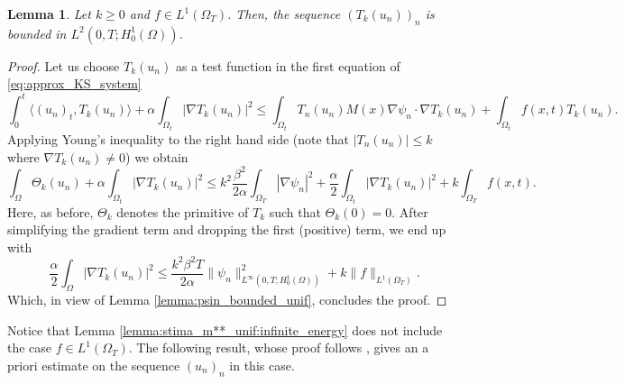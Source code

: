 \documentclass{amsart}
\numberwithin{equation}{section}
\newtheorem{lemma}[example]{Lemma}
\def\elle#1{L^{#1}}
\def\elleomT#1{L^{#1}(\Omega_T)}
\def\Hom{H^1_0(\Omega)}
\def\io{\int_\Omega}
\def\iot{\int_{\Omega_t}}
\def\ioT{\int_{\Omega_T}}
\def\norma#1#2{ \|#1 \|_{#2}}
\newcommand{\abs}[1]{\left|#1\right|}
\begin{document}
\begin{lemma}\label{lemma:Bound_Troncate}
    Let $k\geq 0$ and $f\in\elleomT1$. Then, the sequence $(T_k(u_n))_n$ is bounded in $\elle2(0,T;\Hom)$.
\end{lemma}
\begin{proof}
    Let us choose $T_k(u_n)$ as a test function in the first equation of \eqref{eq:approx_KS_system}
    $$
    \int_0^t \langle (u_n)_t,T_k(u_n)\rangle+\alpha\iot\abs{\nabla T_k(u_n)}^2\leq \iot T_n(u_n) M(x)\nabla\psi_n\cdot\nabla T_k(u_n) +\iot f(x,t)T_k(u_n).
    $$
    Applying Young's inequality to the right hand side (note that $\abs{T_n(u_n)}\leq k$ where $\nabla T_k(u_n)\neq0$) we obtain
    $$
    \io\Theta_k(u_n)+\alpha\iot\abs{\nabla T_k(u_n)}^2
    \leq 
    k^2\frac{\beta^2}{2\alpha}\ioT \abs{\nabla\psi_n}^2+\frac{\alpha}{2}\iot\abs{\nabla T_k(u_n)}^2 +k\ioT f(x,t).
    $$
    Here, as before, $\Theta_k$ denotes the primitive of $T_k$ such that $\Theta_k(0)=0$.
    After simplifying the gradient term and dropping the first (positive) term, we end up with
    $$
    \frac{\alpha}{2}\io\abs{\nabla T_k(u_n)}^2
    \leq 
    \frac{k^2\beta^2T}{2\alpha}\norma{\psi_n}{\elle\infty(0,T;\Hom)}^2+k\norma{f}{\elleomT1}.
    $$
    Which, in view of Lemma \ref{lemma:psin_bounded_unif}, concludes the proof.    
\end{proof}


Notice that Lemma \ref{lemma:stima_m**_unif:infinite_energy} does not include the case $f\in\elleomT1$. The following result, whose proof follows \cite{BO-Kellersegel}, gives an a priori estimate on the sequence $(u_n)_n$ in this case.
\end{document}
